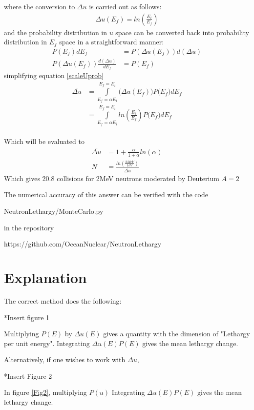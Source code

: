 \documentclass[a4paper, 12pt]{article}
\begin{document}
where the conversion to $\Delta u$ is carried out as follows:
\begin{align}
	\Delta u (E_f) = ln\left(\frac{E_i}{E_f} \right)
\end{align}
and the probability distribution in $u$ space can be converted back into probability distribution in $E_f$ space in a straightforward manner:
\begin{align}
	P(E_f) dE_f &= P(\Delta u (E_f) ) {d(\Delta u)}	\\
	P(\Delta u (E_f) ) \frac{d(\Delta u)}{dE_f} &= P(E_f)
\end{align}
simplifying equation \ref{scaleUprob}
\begin{align}
	\overline{\Delta u} &=	\int\limits_{E_f=\alpha E_i}^{E_f=E_i} \big(\Delta u (E_f) \big) P\big(E_f \big) dE_f	\\
						&=	\int\limits_{E_f=\alpha E_i}^{E_f=E_i} ln \left( \frac{E_i}{E_f} \right) P\big(E_f \big) dE_f \\
\end{align}

Which will be evaluated to
\begin{align}
	\overline{\Delta u} &=	1+\frac{\alpha}{1+\alpha} ln(\alpha)	\\
	N &= \frac{ ln \left( \frac{2 MeV}{1eV} \right)} { \overline{\Delta u} }
\end{align}
Which gives 20.8 collisions for 2MeV neutrons moderated by Deuterium $A=2$

The numerical accuracy of this answer can be verified with the code

NeutronLethargy/MonteCarlo.py

in the repository 

https://github.com/OceanNuclear/NeutronLethargy

\section{Explanation}
	The correct method does the following:
	
	*Insert figure 1
	
	Multiplying $P(E)$ by $\Delta u(E)$ gives a quantity with the dimension of "Lethargy per unit energy".
	Integrating $\Delta u(E) P(E)$ gives the mean lethargy change.

	
	Alternatively, if one wishes to work with $\Delta u$,
	
	*Insert Figure 2
	
	In figure \ref{Fig2}, multiplying $P(u)$ 
	Integrating $\Delta u(E) P(E)$ gives the mean lethargy change.
\end{document}
